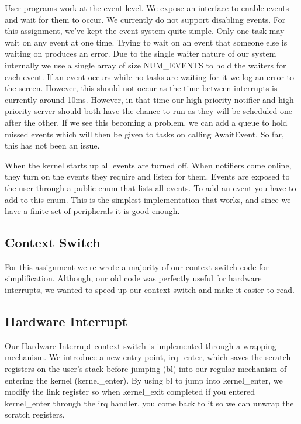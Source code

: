 \documentclass{article}
\begin{document}
User programs work at the event level. We expose an interface to enable events and wait for them to occur. We currently do not support disabling events. For this assignment, we've kept the event system quite simple. Only one task may wait on any event at one time. Trying to wait on an event that someone else is waiting on produces an error. Due to the single waiter nature of our system internally we use a single array of size NUM\_EVENTS to hold the waiters for each event. If an event occurs while no tasks are waiting for it we log an error to the screen. However, this should not occur as the time between interrupts is currently around 10ms. However, in that time our high priority notifier and high priority server should both have the chance to run as they will be scheduled one after the other. If we see this becoming a problem, we can add a queue to hold missed events which will then be given to tasks on calling AwaitEvent. So far, this has not been an issue.

When the kernel starts up all events are turned off. When notifiers come online, they turn on the events they require and listen for them. Events are exposed to the user through a public enum that lists all events. To add an event you have to add to this enum. This is the simplest implementation that works, and since we have a finite set of peripherals it is good enough.

\subsection{Context Switch}

For this assignment we re-wrote a majority of our context switch code for simplification. Although, our old code was perfectly useful for hardware interrupts, we wanted to speed up our context switch and make it easier to read.

\subsection{Hardware Interrupt}

Our Hardware Interrupt context switch is implemented through a wrapping mechanism. We introduce a new entry point, irq\_enter, which saves the scratch registers on the user's stack before jumping (bl) into our regular mechanism of entering the kernel (kernel\_enter). By using bl to jump into kernel\_enter, we modify the link register so when kernel\_exit completed if you entered kernel\_enter through the irq handler, you come back to it so we can unwrap the scratch registers.
\end{document}
